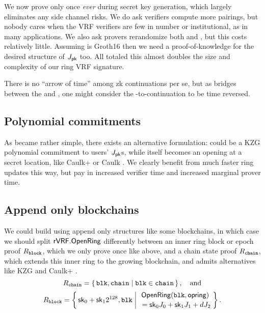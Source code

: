 We now prove \pisk only once {\it ever} during secret key generation,
which largely eliminates any side channel risks.
We do ask verifiers compute more pairings, but nobody cares when
the VRF verifiers are few in number or institutional,
as in many applications.
We also ask provers rerandomize both \pisk and \pipk, but this costs relatively little.
Assuming \pipk is Groth16 then we need a proof-of-knowledge for the desired structure of $J_\mathsf{pk}$ too.
All totaled this almost doubles the size and complexity of our ring VRF signature.

There is no ``arrow of time'' among zk continuations per se, but
as \pisk bridges between the \PedVRF and \pipk,
one might consider the \pisk-to-\pipk continuation to be time reversed.


\subsection{Polynomial commitments}

As \pipk became rather simple, %
there exists an alternative formulation:  
\comring could be a KZG polynomial commitment \cite{KZG} to users' $J_\mathsf{pk}$s,
while \pipk itself becomes an opening at a secret location, like
Caulk+ \cite{caulk+} or Caulk \cite{caulk}.
We clearly benefit from much faster ring updates this way, but pay in
 increased verifier time and increased marginal prover time.


\subsection{Append only blockchains}

\def\comblock{\ensuremath{\mathsf{comblock}}\xspace}
\newcommand\pichain{\ensuremath{\pi_{\mathtt{chain}}}\xspace}

We could build \ring using append only structures like some blockchains,
in which case we should split ${\mathsf{rVRF}}.{\mathsf{OpenRing}}$ differently between
an inner ring block or epoch proof $R_{\mathtt{block}}$,
 which we only prove once like \pisk above, and
a chain state proof $R_{\mathtt{chain}}$,
 which extends this inner ring to the growing blockchain, and
 admits alternatives like KZG and Caulk+ \cite{caulk+}.
%
$$ \baseR_{\mathtt{chain}} = \Setst{ \mathtt{blk}, \mathtt{chain} }{
	\mathtt{blk} \in \mathtt{chain}
} \mathcomma \quad\textrm{and} $$ 
%
$$ \baseR_{\mathtt{block}} = \Setst{ \sk_0 + \sk_1 2^{128}, \mathtt{blk} }{
	\eprint{\exists d,\openring \textrm{\ s.t.\ }}{}
	\genfrac{}{}{0pt}{}{ \OpenRing(\mathtt{blk},\openring) }{ \,\, = \sk_0 \genJ_0 + \sk_1 \genJ_1 + d \genJ_2 }
} \mathperiod $$  

